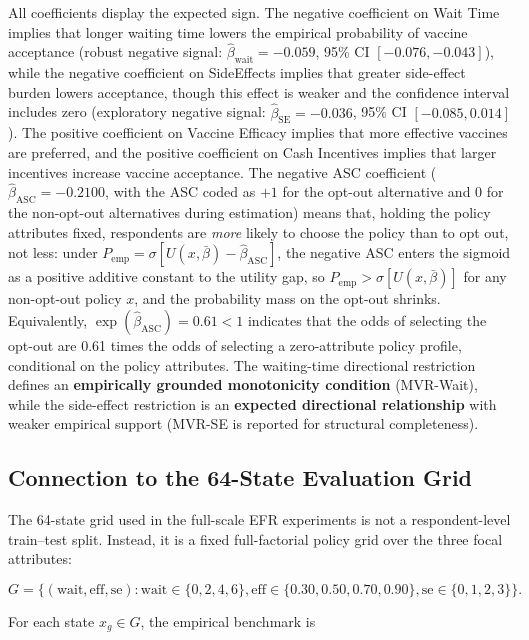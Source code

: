 \documentclass[11pt]{article}
\begin{document}
All coefficients display the expected sign. The negative coefficient on Wait Time implies that longer waiting time lowers the empirical probability of vaccine acceptance (robust negative signal: $\hat\beta_{\text{wait}} = -0.059$, 95\% CI $[-0.076, -0.043]$), while the negative coefficient on SideEffects implies that greater side-effect burden lowers acceptance, though this effect is weaker and the confidence interval includes zero (exploratory negative signal: $\hat\beta_{\text{SE}} = -0.036$, 95\% CI $[-0.085, 0.014]$). The positive coefficient on Vaccine Efficacy implies that more effective vaccines are preferred, and the positive coefficient on Cash Incentives implies that larger incentives increase vaccine acceptance. The negative ASC coefficient ($\hat\beta_{\mathrm{ASC}} = -0.2100$, with the ASC coded as $+1$ for the opt-out alternative and $0$ for the non-opt-out alternatives during estimation) means that, holding the policy attributes fixed, respondents are \emph{more} likely to choose the policy than to opt out, not less: under $P_{\mathrm{emp}} = \sigma[U(x, \bar\beta) - \hat\beta_{\mathrm{ASC}}]$, the negative ASC enters the sigmoid as a positive additive constant to the utility gap, so $P_{\mathrm{emp}} > \sigma[U(x, \bar\beta)]$ for any non-opt-out policy $x$, and the probability mass on the opt-out shrinks. Equivalently, $\exp(\hat\beta_{\mathrm{ASC}}) = 0.61 < 1$ indicates that the odds of selecting the opt-out are 0.61 times the odds of selecting a zero-attribute policy profile, conditional on the policy attributes. The waiting-time directional restriction defines an \textbf{empirically grounded monotonicity condition} (MVR-Wait), while the side-effect restriction is an \textbf{expected directional relationship} with weaker empirical support (MVR-SE is reported for structural completeness).

\subsection{Connection to the 64-State Evaluation Grid}

The 64-state grid used in the full-scale EFR experiments is not a respondent-level train--test split. Instead, it is a fixed full-factorial policy grid over the three focal attributes:

\[
G
=
\{(\text{wait}, \text{eff}, \text{se}) :
\text{wait} \in \{0,2,4,6\},
\text{eff} \in \{0.30,0.50,0.70,0.90\},
\text{se} \in \{0,1,2,3\}
\}.
\]

For each state \(x_g \in G\), the empirical benchmark is
\end{document}
